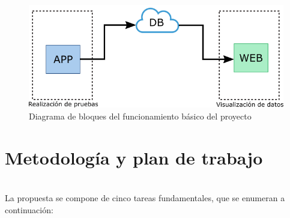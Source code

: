 \documentclass[12pt,oneside,a4paper]{article}
\begin{document}
\begin{figure}[H]
  \centering
  \includegraphics[width=15cm]{anteproyecto/figuras/tfg_diagramabloques_simple.png}
  \caption{Diagrama de bloques del funcionamiento básico del proyecto}
  \label{fig:ejemplo}
\end{figure}


\section{Metodología y plan de trabajo} \\
\hline
La propuesta se compone de cinco tareas fundamentales, que se enumeran a continuación: 
\end{document}
